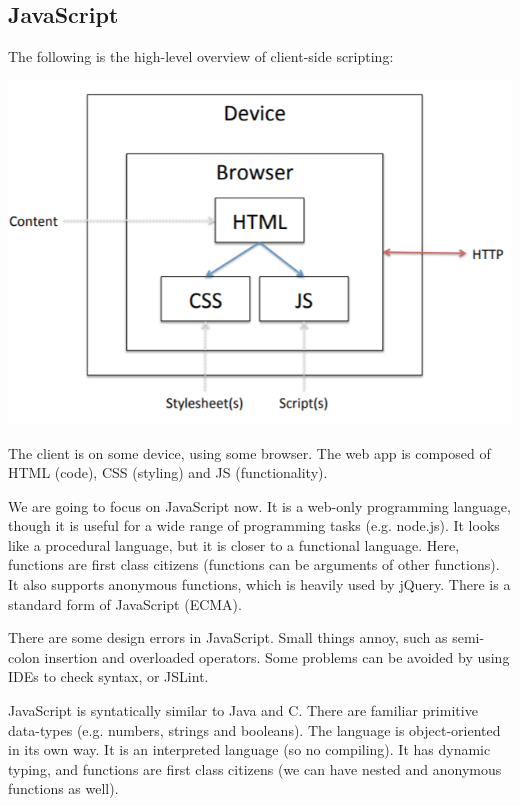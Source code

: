 \documentclass[a4paper, openany]{memoir}
\begin{document}
\subsection{JavaScript}
The following is the high-level overview of client-side scripting:
\begin{center}
    \includegraphics[scale=0.7]{src/L13I1.PNG}
\end{center}
The client is on some device, using some browser. The web app is composed of HTML (code), CSS (styling) and JS (functionality). 

\noindent We are going to focus on JavaScript now. It is a web-only programming language, though it is useful for a wide range of programming tasks (e.g. node.js). It looks like a procedural language, but it is closer to a functional language. Here, functions are first class citizens (functions can be arguments of other functions). It also supports anonymous functions, which is heavily used by jQuery. There is a standard form of JavaScript (ECMA).

\noindent There are some design errors in JavaScript. Small things annoy, such as semi-colon insertion and overloaded operators. Some problems can be avoided by using IDEs to check syntax, or JSLint.

\noindent JavaScript is syntatically similar to Java and C. There are familiar primitive data-types (e.g. numbers, strings and booleans). The language is object-oriented in its own way. It is an interpreted language (so no compiling). It has dynamic typing, and functions are first class citizens (we can have nested and anonymous functions as well).
\end{document}

